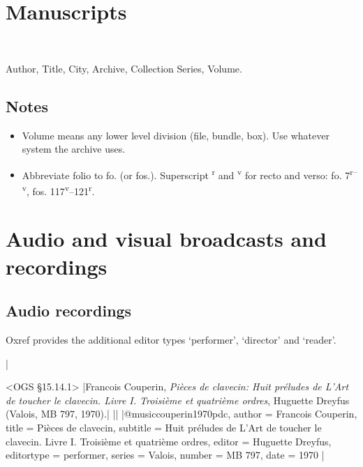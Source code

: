 \documentclass[extrafontsizes,11pt,a4paper,oneside]{memoir}
\newcommand*{\code}[1]{`\textsf{#1}'}
\begin{document}
\chapter{Manuscripts}\label{sec:ms}

\begin{description}
  \item[Form]~
  \item Author, Title, City, Archive, Collection Series, Volume.
\end{description}

\section{Notes}

\begin{itemize}
  \item Volume means any lower level division (file, bundle, box). Use whatever system the archive uses.
  \item Abbreviate folio to fo. (or fos.). Superscript \textsuperscript{r} and \textsuperscript{v} for recto and verso: fo. 7\textsuperscript{r--v}, fos. 117\textsuperscript{v}--121\textsuperscript{r}.
\end{itemize}

\chapter{Audio and visual broadcasts and recordings}\label{sec:audiovideo}

\section{Audio recordings}

Oxref provides the additional editor types \code{performer}, \code{director} and \code{reader}.

|

\bibexample<OGS \S15.14.1>
|Francois Couperin, \emph{Pièces de clavecin: Huit préludes de L'Art de toucher le clavecin. Livre I. Troisième et quatrième ordres}, Huguette Dreyfus (Valois, MB 797, 1970).|%
||%
|@music{couperin1970pdc,
  author = {Francois Couperin},
  title = {Pièces de clavecin},
  subtitle = {Huit préludes de L'Art de toucher le clavecin. Livre I. Troisième et quatrième ordres},
  editor = {Huguette Dreyfus},
  editortype = {performer},
  series = {Valois},
  number = {MB 797},
  date = {1970}
}|
\end{document}
